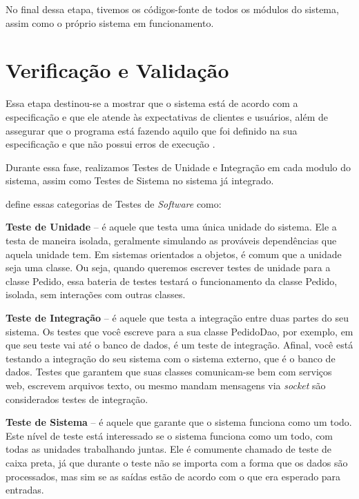 No final dessa etapa, tivemos os códigos-fonte de todos os módulos do sistema, assim como o próprio sistema em funcionamento. 

\section{Verificação e Validação}
Essa etapa destinou-se a mostrar que o sistema está de acordo com a especificação e que ele atende às expectativas de clientes e usuários, al\'em de assegurar que o  programa está fazendo aquilo que foi definido na sua especificação e que não possui  erros  de execução \cite{aguiar2012requisitos}. 

Durante essa fase, realizamos Testes de Unidade e Integra\c{c}\~ao em cada modulo do sistema, assim como Testes de Sistema no sistema j\'a integrado.

 define essas categorias de Testes de \textit{Software} como:

\begin{alineascomponto}
	\item \textbf{Teste de Unidade} -- é aquele que testa uma única unidade do sistema. Ele a testa de maneira isolada, geralmente simulando as 
prováveis dependências que aquela unidade tem. Em sistemas orientados a objetos, é comum que a unidade seja uma classe. Ou seja, quando 
queremos escrever testes de unidade para a classe Pedido, essa bateria de testes testará o funcionamento da classe Pedido, 
isolada, sem interações com outras classes.
	\item \textbf{Teste de Integração} -- é aquele que testa a integração entre duas partes do seu sistema. Os testes que você escreve para a sua 
classe PedidoDao, por exemplo, em que seu teste vai até o banco de dados, é um teste de integração. Afinal, você está testando a integração 
do seu sistema com o sistema externo, que é o banco de dados. Testes que garantem que suas classes comunicam-se bem 
com serviços web, escrevem arquivos texto, ou mesmo mandam mensagens via \textit{socket} são considerados testes de integração.
	\item \textbf{Teste de Sistema} -- \'e aquele que garante que o sistema funciona como um todo. Este 
nível de teste está interessado se o sistema funciona como um todo, com todas as 
unidades trabalhando juntas. Ele é comumente chamado de teste de caixa preta, já 
que durante o teste n\~ao se importa com a forma que os dados s\~ao processados, mas sim se as sa\'idas est\~ao de acordo com o que era esperado para entradas. 
\end{alineascomponto}

